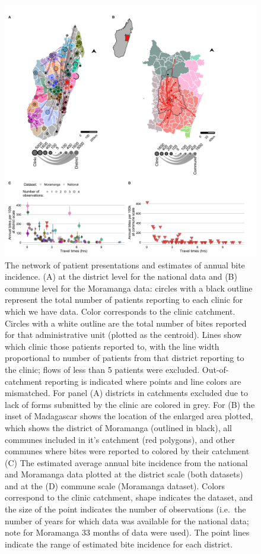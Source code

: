 \documentclass[
  oneside]{book}
\begin{document}
\begin{figure}
\includegraphics[width=0.9\linewidth]{figs/ch2/fig3} \caption[The network of patient presentations and estimates of annual bite incidence across Madagascar.]{The network of patient presentations and estimates of annual bite incidence. (A) at the district level for the national data and (B) commune level
for the Moramanga data: circles with a black outline represent the total
number of patients reporting to each clinic for which we have data.
Color corresponds to the clinic catchment. Circles with a white outline
are the total number of bites reported for that administrative unit
(plotted as the centroid). Lines show which clinic those patients
reported to, with the line width proportional to number of patients from
that district reporting to the clinic; flows of less than 5 patients
were excluded. Out-of-catchment reporting is indicated where points and
line colors are mismatched. For panel (A) districts in catchments
excluded due to lack of forms submitted by the clinic are colored in
grey. For (B) the inset of Madagascar shows the location of the enlarged
area plotted, which shows the district of Moramanga (outlined in black),
all communes included in it's catchment (red polygons), and other
communes where bites were reported to colored by their catchment (C) The
estimated average annual bite incidence from the national and Moramanga
data plotted at the district scale (both datasets) and at the (D)
commune scale (Moramanga dataset). Colors correspond to the clinic
catchment, shape indicates the dataset, and the size of the point
indicates the number of observations (i.e.~the number of years for which
data was available for the national data; note for Moramanga 33 months
of data were used). The point lines indicate the range of estimated bite
incidence for each district.}\label{fig:ch3-fig3}
\end{figure}
\end{document}
